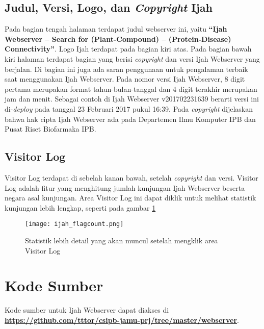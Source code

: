 	\subsection{Judul, Versi, Logo, dan \emph{Copyright} Ijah} \label{judul}
	Pada bagian tengah halaman terdapat judul webserver ini, yaitu \textbf{``Ijah Webserver -- Search for (Plant-Compound) -- (Protein-Disease) Connectivity''}. Logo Ijah terdapat pada bagian kiri atas. Pada bagian bawah kiri halaman terdapat bagian yang berisi \emph{copyright} dan versi Ijah Webserver yang berjalan. Di bagian ini juga ada saran penggunaan untuk pengalaman terbaik saat menggunakan Ijah Webserver. Pada nomor versi Ijah Webserver, 8 digit pertama merupakan format tahun-bulan-tanggal dan 4 digit terakhir merupakan jam dan menit. Sebagai contoh di Ijah Webserver v201702231639 berarti versi ini di-\emph{deploy} pada tanggal 23 Februari 2017 pukul 16:39. Pada \emph{copyright} dijelaskan bahwa hak cipta Ijah Webserver ada pada Departemen Ilmu Komputer IPB dan Pusat Riset Biofarmaka IPB.


	\subsection{Visitor Log} \label{visitor log}
	Visitor Log terdapat di sebelah kanan bawah, setelah \emph{copyright} dan versi. Visitor Log adalah fitur yang menghitung jumlah kunjungan Ijah Webserver beserta negara asal kunjungan. Area Visitor Log ini dapat diklik untuk melihat statistik kunjungan lebih lengkap, seperti pada gambar \ref{fig:ijah_flagcount}

	\begin{figure}[H]
	\centering
	\texttt{[image: ijah\_flagcount.png]}
	\caption{Statistik lebih detail yang akan muncul setelah mengklik area Visitor Log}
	\label{fig:ijah_flagcount}
	\end{figure}

\section{Kode Sumber} \label{ws_source}
Kode sumber untuk Ijah Webserver dapat diakses di \href{https://github.com/tttor/csipb-jamu-prj/tree/master/webserver}{\textbf{https://github.com/tttor/csipb-jamu-prj/tree/master/webserver}}.
